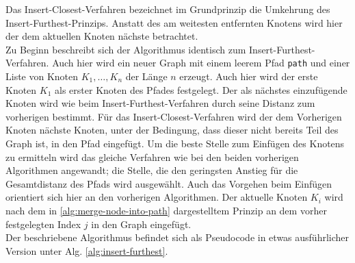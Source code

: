 Das Insert-Closest-Verfahren bezeichnet im Grundprinzip die Umkehrung des Insert-Furthest-Prinzips. 
Anstatt des am weitesten entfernten Knotens wird hier der dem aktuellen Knoten nächste betrachtet.
\\
Zu Beginn beschreibt sich der Algorithmus identisch zum Insert-Furthest-Verfahren.
Auch hier wird ein neuer Graph mit einem leerem Pfad \lstinline{path} und einer Liste von Knoten $K_1, \dots ,K_n$ der Länge $n$ erzeugt.
Auch hier wird der erste Knoten $K_1$ als erster Knoten des Pfades festgelegt.
Der als nächstes einzufügende Knoten wird wie beim Insert-Furthest-Verfahren durch seine Distanz zum vorherigen bestimmt.
Für das Insert-Closest-Verfahren wird der dem Vorherigen Knoten nächste Knoten, unter der Bedingung, dass dieser nicht bereits Teil des Graph ist, in den Pfad eingefügt.
Um die beste Stelle zum Einfügen des Knotens zu ermitteln wird das gleiche Verfahren wie bei den beiden vorherigen Algorithmen angewandt; die Stelle, die den geringsten Anstieg für die Gesamtdistanz des Pfads wird ausgewählt.
Auch das Vorgehen beim Einfügen orientiert sich hier an den vorherigen Algorithmen.
Der aktuelle Knoten $K_i$ wird nach dem in \vref{alg:merge-node-into-path} dargestelltem Prinzip an dem vorher festgelegten Index $j$ in den Graph eingefügt.
\\
Der beschriebene Algorithmus befindet sich als Pseudocode in etwas ausführlicher Version unter \ac{Alg.} \vref{alg:insert-furthest}.
